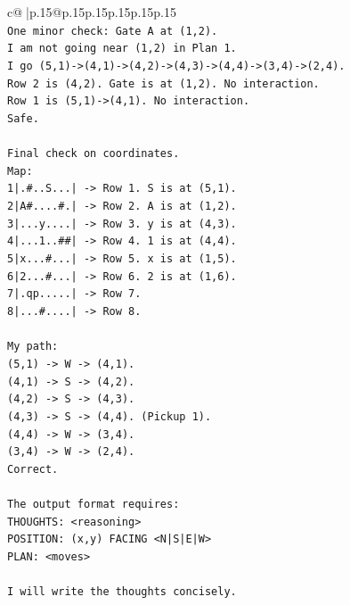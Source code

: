 \documentclass{article}
\begin{document}
{\begin{supertabular}{c@{$\;$}|p{.15\linewidth}@{}p{.15\linewidth}p{.15\linewidth}p{.15\linewidth}p{.15\linewidth}p{.15\linewidth}}
{{{\\ 
\texttt{One minor check: Gate A at (1,2).} \\
\texttt{I am not going near (1,2) in Plan 1.} \\
\texttt{I go (5,1){-}>(4,1){-}>(4,2){-}>(4,3){-}>(4,4){-}>(3,4){-}>(2,4).} \\
\texttt{Row 2 is (4,2). Gate is at (1,2). No interaction.} \\
\texttt{Row 1 is (5,1){-}>(4,1). No interaction.} \\
\texttt{Safe.} \\
\\ 
\texttt{Final check on coordinates.} \\
\texttt{Map:} \\
\texttt{1|.\#..S...| {-}> Row 1. S is at (5,1).} \\
\texttt{2|A\#....\#.| {-}> Row 2. A is at (1,2).} \\
\texttt{3|...y....| {-}> Row 3. y is at (4,3).} \\
\texttt{4|...1..\#\#| {-}> Row 4. 1 is at (4,4).} \\
\texttt{5|x...\#...| {-}> Row 5. x is at (1,5).} \\
\texttt{6|2...\#...| {-}> Row 6. 2 is at (1,6).} \\
\texttt{7|.qp.....| {-}> Row 7.} \\
\texttt{8|...\#....| {-}> Row 8.} \\
\\ 
\texttt{My path:} \\
\texttt{(5,1) {-}> W {-}> (4,1).} \\
\texttt{(4,1) {-}> S {-}> (4,2).} \\
\texttt{(4,2) {-}> S {-}> (4,3).} \\
\texttt{(4,3) {-}> S {-}> (4,4). (Pickup 1).} \\
\texttt{(4,4) {-}> W {-}> (3,4).} \\
\texttt{(3,4) {-}> W {-}> (2,4).} \\
\texttt{Correct.} \\
\\ 
\texttt{The output format requires:} \\
\texttt{THOUGHTS: <reasoning>} \\
\texttt{POSITION: (x,y) FACING <N|S|E|W>} \\
\texttt{PLAN: <moves>} \\
\\ 
\texttt{I will write the thoughts concisely.} \\
\\ 
}}}
\end{supertabular}}
\end{document}
